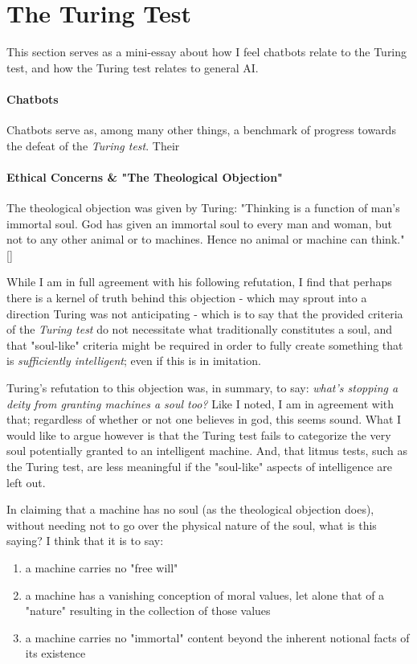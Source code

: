 \documentclass[]{article}
\begin{document}
\section{The Turing Test}

This section serves as a mini-essay about how I feel chatbots relate to the Turing test, and how the Turing test relates to general AI.

\paragraph{Chatbots} Chatbots serve as, among many other things, a benchmark of progress towards the defeat of the \emph{Turing test}. Their 

\paragraph{Ethical Concerns \& "The Theological Objection"} The theological objection was given by Turing: "Thinking is a function of man's immortal soul. God has given an immortal soul to every man and woman, but not to any other animal or to machines. Hence no animal or machine can think." []

While I am in full agreement with his following refutation, I find that perhaps there is a kernel of truth behind this objection - which may sprout into a direction Turing was not anticipating - which is to say that the provided criteria of the \emph{Turing test} do not necessitate what traditionally constitutes a soul, and that "soul-like" criteria might be required in order to fully create something that is \emph{sufficiently intelligent}; even if this is in imitation.

Turing's refutation to this objection was, in summary, to say: \emph{what's stopping a deity from granting machines a soul too?} Like I noted, I am in agreement with that; regardless of whether or not one believes in god, this seems sound. What I would like to argue however is that the Turing test fails to categorize the very soul potentially granted to an intelligent machine. And, that litmus tests, such as the Turing test, are less meaningful if the "soul-like" aspects of intelligence are left out.

In claiming that a machine has no soul (as the theological objection does), without needing not to go over the physical nature of the soul, what is this saying? I think that it is to say:
\begin{enumerate}
	\item a machine carries no "free will"
	\item a machine has a vanishing conception of moral values, let alone that of a "nature" resulting in the collection of those values
	\item a machine carries no "immortal" content beyond the inherent notional facts of its existence
\end{enumerate}
\end{document}
